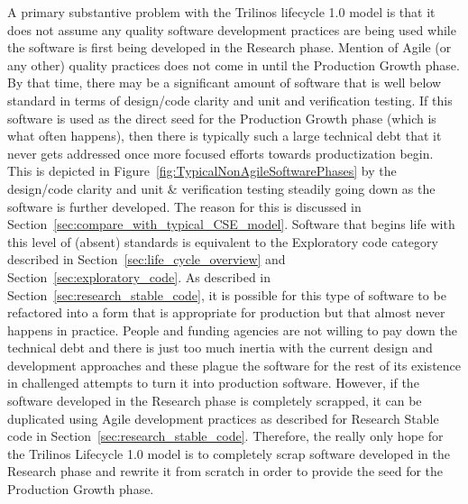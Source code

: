 \documentclass[11pt]{SANDreport}
\begin{document}
A primary substantive problem with the Trilinos lifecycle 1.0 model is
that it does not assume any quality software development practices are
being used while the software is first being developed in the Research
phase.  Mention of Agile (or any other) quality practices does not
come in until the Production Growth phase.  By that time, there may be
a significant amount of software that is well below standard in terms
of design/code clarity and unit and verification testing.  If this
software is used as the direct seed for the Production Growth phase
(which is what often happens), then there is typically such a large
technical debt that it never gets addressed once more focused efforts
towards productization begin.  This is depicted in
Figure~\ref{fig:TypicalNonAgileSoftwarePhases} by the design/code
clarity and unit \& verification testing steadily going down as the
software is further developed.  The reason for this is discussed in
Section~\ref{sec:compare_with_typical_CSE_model}.  Software that
begins life with this level of (absent) standards is equivalent to the
Exploratory code category described in
Section~\ref{sec:life_cycle_overview} and
Section~\ref{sec:exploratory_code}.  As described in
Section~\ref{sec:research_stable_code}, it is possible for this type
of software to be refactored into a form that is appropriate for
production but that almost never happens in practice.  People and
funding agencies are not willing to pay down the technical debt and
there is just too much inertia with the current design and development
approaches and these plague the software for the rest of its existence
in challenged attempts to turn it into production software.  However,
if the software developed in the Research phase is completely
scrapped, it can be duplicated using Agile development practices as
described for Research Stable code in
Section~\ref{sec:research_stable_code}.  Therefore, the really only
hope for the Trilinos Lifecycle 1.0 model is to completely scrap
software developed in the Research phase and rewrite it from scratch
in order to provide the seed for the Production Growth phase.
\end{document}
